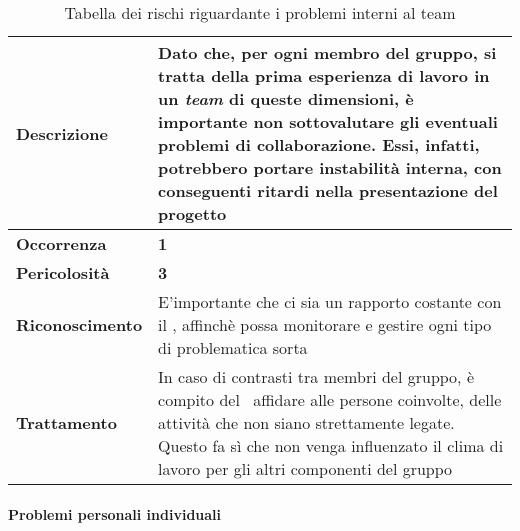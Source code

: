 \begin{table}[H]
	\begin{center}
		\begin{tabular}{|>{\centering\arraybackslash} m{3cm}  ||>{\centering\arraybackslash} m{10cm}|}
			\hline
			\textbf{Descrizione}	& Dato che, per ogni membro del gruppo, si tratta della prima esperienza di lavoro in un \textit{team\ped{G}} di queste dimensioni, è importante non sottovalutare gli eventuali problemi di collaborazione. Essi, infatti, potrebbero portare instabilità interna, con conseguenti ritardi nella presentazione del progetto \\
			\hline
			\textbf{Occorrenza}	&	\textbf{1}	\\
			\hline
			\textbf{Pericolosità}	&	\textbf{3}	\\
			\hline
			\textbf{Riconoscimento}	&	E'importante che ci sia un rapporto costante con il \textit{\RdP}, affinchè possa monitorare e gestire ogni tipo di problematica sorta	\\
			\hline
			\textbf{Trattamento}	&	In caso di contrasti tra membri del gruppo, è compito del \textit{\RdP}\ affidare alle persone coinvolte, delle attività che non siano strettamente legate. Questo fa sì che non venga influenzato il clima di lavoro per gli altri componenti del gruppo	\\
			\hline
		\end{tabular}
		\caption{Tabella dei rischi riguardante i problemi interni al team}
	\end{center}
\end{table}

\paragraph{Problemi personali individuali}


